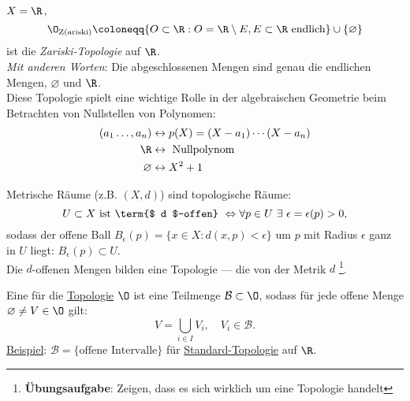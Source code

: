 \begin{example}
  \label{bsp:zariskitopologie}
  $ X = \R $,
  \begin{equation*}
    \O_\text{Z(ariski)} \coloneqq \{ O \subset \R : O = \R \setminus E, E \subset \R \text{ endlich} \} \cup \{ \varnothing \}
  \end{equation*}
  ist die \emph{Zariski-Topologie} auf $ \R $. \\
  \emph{Mit anderen Worten}: Die abgeschlossenen Mengen sind genau die endlichen Mengen, $ \varnothing $ und $ \R $. \\
  Diese Topologie spielt eine wichtige Rolle in der algebraischen Geometrie beim Betrachten von Nullstellen von Polynomen: \\
  \begin{align*}
    (a_1 \dots, a_n) &\leftrightarrow p(X) = (X-a_1)\cdots(X-a_n) \\
     \R &\leftrightarrow \text{ Nullpolynom} \\
     \varnothing &\leftrightarrow X^2+1
  \end{align*}
\end{example}

\begin{definition}
  \label{def:induzierteTopologie}
  Metrische Räume (z.B. $ (X, d) $) sind topologische Räume: \\
  \begin{equation*}
    U \subset X \text{ ist \term{$ d $-offen} } \Leftrightarrow \forall p \in U \ \exists \ \epsilon = \epsilon(p) > 0\text{,}
  \end{equation*}
  sodass der offene Ball $ B_\epsilon(p) = \{ x \in X : d(x,p) < \epsilon \} $ um $ p $ mit Radius $ \epsilon $ ganz in $ U $ liegt: $ B_\epsilon(p) \subset U $. \\
  Die $ d $-offenen Mengen bilden eine Topologie --- die von der Metrik $ d $ \footnote{\textbf{Übungsaufgabe}: Zeigen, dass es sich wirklich um eine Topologie handelt}.
\end{definition}

\begin{definition}[Basis]
  \label{def:basis}
  Eine  für die \hyperref[def:topologie]{Topologie} $ \O $ ist eine Teilmenge $ \mathcal{B} \subset \O $, sodass für jede offene Menge $ \varnothing \neq V \in \O $ gilt:
  \begin{equation*}
    V = \bigcup_{i \in I}V_i, \quad V_i \in \mathcal{B}\text{.}
  \end{equation*}
  \underline{Beispiel}: $ \mathcal{B} = \{ \text{offene Intervalle} \} $ für \hyperref[bsp:standardtopologie]{Standard-Topologie} auf $ \R $.
\end{definition}

